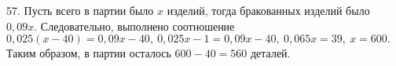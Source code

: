 57. Пусть всего в партии было $x$ изделий, тогда бракованных изделий было $0,09x.$ Следовательно, выполнено соотношение $0,025(x-40)=0,09x-40,\ 0,025x-1=0,09x-40,\ 0,065x=39,\ x=600.$ Таким образом, в партии осталось $600-40=560$ деталей.\\
